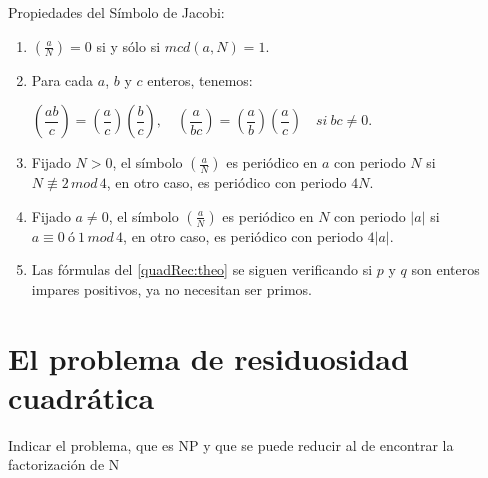 \begin{theorem}
	Propiedades del Símbolo de Jacobi:
	
	\begin{enumerate}[label=(\roman*)]
		\item 	$\left( \frac{a}{N} \right) = 0$ si y sólo si $mcd(a, N) = 1$.
		\item Para cada $a$, $b$ y $c$ enteros, tenemos: \\
		
		\begin{center}
			$
			\left( \dfrac{ab}{c} \right) = \left( \dfrac{a}{c} \right) \left( \dfrac{b}{c} \right), \quad \left( \dfrac{a}{bc} \right) = \left( \dfrac{a}{b} \right) \left( \dfrac{a}{c} \right) \quad si\ bc \neq 0
			$.
		\end{center}
		
		\item Fijado $N > 0$, el símbolo $ \left( \frac{a}{N} \right) $ es periódico en $a$ con periodo $N$ si $N \not\equiv 2 \, mod \, 4$, en otro caso, es periódico con periodo $4N$.
		
		\item Fijado $a \neq 0$, el símbolo $ \left( \frac{a}{N} \right) $ es periódico en $N$ con periodo $|a|$ si $a \equiv 0 \ ó \ 1 \, mod \, 4$, en otro caso, es periódico con periodo $4|a|$.
		
		\item Las fórmulas del \autoref{quadRec:theo} se siguen verificando si $p$ y $q$ son enteros impares positivos, ya no necesitan ser primos.
		
	\end{enumerate}
\end{theorem}



\section{El problema de residuosidad cuadrática}


Indicar el problema, que es NP y que se puede reducir al de encontrar la factorización de N

